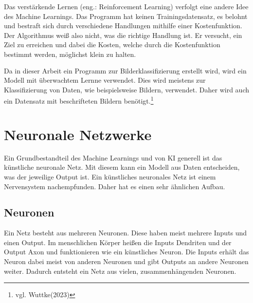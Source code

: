 \documentclass[11pt,oneside]{report}
\begin{document}
Das verstärkende Lernen (eng.: Reinforcement Learning) verfolgt eine andere Idee des Machine Learnings. Das Programm hat keinen Trainingsdatensatz, es belohnt und bestraft sich durch verschiedene Handlungen mithilfe einer Kostenfunktion. Der Algorithmus weiß also nicht, was die richtige Handlung ist. Er versucht, ein Ziel zu erreichen und dabei die Kosten, welche durch die Kostenfunktion bestimmt werden, möglichst klein zu halten.

Da in dieser Arbeit ein Programm zur Bilderklassifizierung erstellt wird, wird ein Modell mit überwachtem Lernne verwendet. Dies wird meistens zur Klassifizierung von Daten, wie beispielsweise Bildern, verwendet. Daher wird auch ein Datensatz mit beschrifteten Bildern benötigt.\footnote{vgl. Wuttke(2023)}


\section{Neuronale Netzwerke}
Ein Grundbestandteil des Machine Learnings und von KI generell ist das künstliche neuronale Netz. Mit diesem kann ein Modell aus Daten entscheiden, was der jeweilige Output ist. Ein künstliches neuronales Netz ist einem Nervensystem nachempfunden. Daher hat es einen sehr ähnlichen Aufbau.

\subsection{Neuronen}
Ein Netz besteht aus mehreren Neuronen. Diese haben meist mehrere Inputs und einen Output. Im menschlichen Körper heißen die Inputs Dendriten und der Output Axon und funktionieren wie ein künstliches Neuron. Die Inputs erhält das Neuron dabei meist von anderen Neuronen und gibt Outputs an andere Neuronen weiter. Dadurch entsteht ein Netz aus vielen, zusammenhängenden Neuronen.
\end{document}
